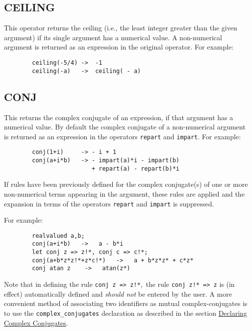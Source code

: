 \subsection{CEILING}
\hypertarget{operator:CEILING}{}
This operator returns the ceiling (i.e., the least integer greater than
the given argument) if its single argument has a numerical value.  A
non-numerical argument is returned as an expression in the original
operator.  For example:

\begin{verbatim}
        ceiling(-5/4) ->  -1
        ceiling(-a)   ->  ceiling( - a)
\end{verbatim}

\subsection{CONJ}
\hypertarget{operator:CONJ}{}
This returns the complex conjugate
of an expression, if that argument has a numerical value.  By default the
complex conjugate of a non-numerical argument is returned as an expression
in the operators
\texttt{repart} and \texttt{impart}.
For example:
\begin{verbatim}
        conj(1+i)     -> - i + 1
        conj(a+i*b)   -> - impart(a)*i - impart(b)
                         + repart(a) - repart(b)*i
\end{verbatim}

If rules have been previously defined for the complex conjugate(s)
of one or more non-numerical terms appearing in the argument, these rules are
applied and the expansion in terms of the operators
\texttt{repart} and \texttt{impart} is
suppressed.

For example:
\begin{verbatim}
        realvalued a,b;
        conj(a+i*b)   ->   a - b*i
        let conj z => z!*, conj c => c!*;
        conj(a+b*z*z!*+z*c!*)   ->   a + b*z*z* + c*z*
        conj atan z    ->   atan(z*)
\end{verbatim}
Note that in defining the rule \texttt{conj z => z!*},\ the rule
\texttt{conj z!*  => z} is (in effect) automatically defined and
\emph{should not} be entered by the user.  A more convenient method of
associating two identifiers as mutual complex-conjugates is to use the
\texttt{complex\_conjugates} declaration as described in the section
\hyperlink{command:COMPLEX_CONJUGATES}{Declaring Complex Conjugates}.

